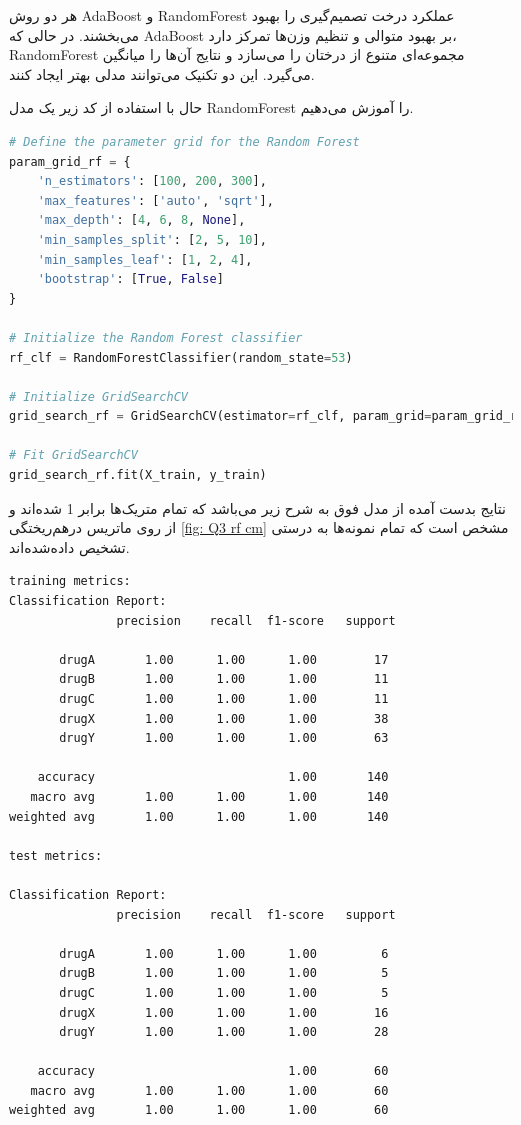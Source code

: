 \documentclass{article}
\begin{document}
هر دو روش AdaBoost و RandomForest عملکرد درخت تصمیم‌گیری را بهبود می‌بخشند. در حالی که AdaBoost بر بهبود متوالی و تنظیم وزن‌ها تمرکز دارد، RandomForest مجموعه‌ای متنوع از درختان را می‌سازد و نتایج آن‌ها را میانگین می‌گیرد. این دو تکنیک می‌توانند مدلی بهتر ایجاد کنند.
\cite{geeksforgeeks2023differences}

حال با استفاده از کد زیر یک مدل
RandomForest
را آموزش می‌دهیم.


\begin{LTR}
\begin{lstlisting}[language=Python, caption=Random Forest Training]
# Define the parameter grid for the Random Forest
param_grid_rf = {
    'n_estimators': [100, 200, 300],
    'max_features': ['auto', 'sqrt'],
    'max_depth': [4, 6, 8, None],
    'min_samples_split': [2, 5, 10],
    'min_samples_leaf': [1, 2, 4],
    'bootstrap': [True, False]
}

# Initialize the Random Forest classifier
rf_clf = RandomForestClassifier(random_state=53)

# Initialize GridSearchCV
grid_search_rf = GridSearchCV(estimator=rf_clf, param_grid=param_grid_rf, cv=5, n_jobs=-1, )

# Fit GridSearchCV
grid_search_rf.fit(X_train, y_train)

\end{lstlisting}
\end{LTR}

نتایج بدست آمده از مدل فوق به شرح زیر می‌باشد که تمام متریک‌ها برابر 1 شده‌اند و از روی ماتریس درهم‌ریختگی 
\autoref{fig: Q3 rf cm}
 مشخص است که تمام نمونه‌ها به درستی تشخیص داده‌شده‌اند.


\begin{LTR}
\begin{verbatim}
training metrics:
Classification Report:
               precision    recall  f1-score   support

       drugA       1.00      1.00      1.00        17
       drugB       1.00      1.00      1.00        11
       drugC       1.00      1.00      1.00        11
       drugX       1.00      1.00      1.00        38
       drugY       1.00      1.00      1.00        63

    accuracy                           1.00       140
   macro avg       1.00      1.00      1.00       140
weighted avg       1.00      1.00      1.00       140

test metrics:

Classification Report:
               precision    recall  f1-score   support

       drugA       1.00      1.00      1.00         6
       drugB       1.00      1.00      1.00         5
       drugC       1.00      1.00      1.00         5
       drugX       1.00      1.00      1.00        16
       drugY       1.00      1.00      1.00        28

    accuracy                           1.00        60
   macro avg       1.00      1.00      1.00        60
weighted avg       1.00      1.00      1.00        60
\end{verbatim}
\end{LTR}
\end{document}
